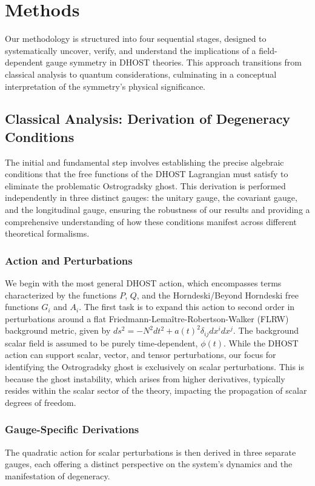 \documentclass[twocolumn]{aastex631}
\begin{document}
\section{Methods}
\label{sec:methods}
Our methodology is structured into four sequential stages, designed to systematically uncover, verify, and understand the implications of a field-dependent gauge symmetry in DHOST theories. This approach transitions from classical analysis to quantum considerations, culminating in a conceptual interpretation of the symmetry's physical significance.

\subsection{Classical Analysis: Derivation of Degeneracy Conditions}

The initial and fundamental step involves establishing the precise algebraic conditions that the free functions of the DHOST Lagrangian must satisfy to eliminate the problematic Ostrogradsky ghost. This derivation is performed independently in three distinct gauges: the unitary gauge, the covariant gauge, and the longitudinal gauge, ensuring the robustness of our results and providing a comprehensive understanding of how these conditions manifest across different theoretical formalisms.

\subsubsection{Action and Perturbations}
We begin with the most general DHOST action, which encompasses terms characterized by the functions $P$, $Q$, and the Horndeski/Beyond Horndeski free functions $G_i$ and $A_i$. The first task is to expand this action to second order in perturbations around a flat Friedmann-Lemaître-Robertson-Walker (FLRW) background metric, given by $ds^2 = -N^2 dt^2 + a(t)^2 \delta_{ij} dx^i dx^j$. The background scalar field is assumed to be purely time-dependent, $\phi(t)$. While the DHOST action can support scalar, vector, and tensor perturbations, our focus for identifying the Ostrogradsky ghost is exclusively on scalar perturbations. This is because the ghost instability, which arises from higher derivatives, typically resides within the scalar sector of the theory, impacting the propagation of scalar degrees of freedom.

\subsubsection{Gauge-Specific Derivations}
The quadratic action for scalar perturbations is then derived in three separate gauges, each offering a distinct perspective on the system's dynamics and the manifestation of degeneracy.
\end{document}
